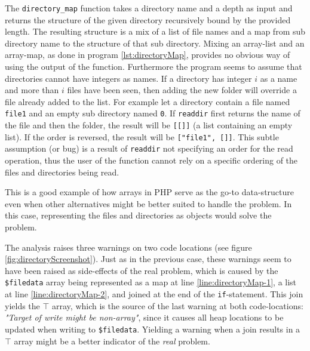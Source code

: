 The \texttt{directory\_map} function takes a directory name and a depth as input and returns the structure of the given directory recursively bound by the provided length. The resulting structure is a mix of a list of file names and a map from sub directory name to the structure of that sub directory. Mixing an array-list and an array-map, as done in program \ref{lst:directoryMap}, provides no obvious way of using the output of the function. Furthermore the program seems to assume that directories cannot have integers as names. If a directory has integer  $i$ as a name and more than $i$ files have been seen, then adding the new folder will override a file already added to the list. For example let a directory contain a file named \texttt{file1} and an empty sub directory named \texttt{0}. If \texttt{readdir} first returns the name of the file and then the folder, the result will be \texttt{[[]]} (a list containing an empty list). If the order is reversed, the result will be \texttt{["file1", []]}. This subtle assumption (or bug) is a result of \texttt{readdir} not specifying an order for the read operation, thus the user of the function cannot rely on a specific ordering of the files and directories being read.

This is a good example of how arrays in PHP serve as the go-to data-structure even when other alternatives might be better suited to handle the problem. In this case, representing the files and directories as objects would solve the problem.


The analysis raises three warnings on two code locations (see figure \ref{fig:directoryScreenshot}). Just as in the previous case, these warnings seem to have been raised as side-effects of the real problem, which is caused by the \texttt{\$filedata} array being represented as a map at line \ref{line:directoryMap-1}, a list at line \ref{line:directoryMap-2}, and joined at the end of the \texttt{if}-statement. This join yields the $\top$ array, which is the source of the last warning at both code-locations: \textit{"Target of write might be non-array"}, since it causes all heap locations to be updated when writing to \texttt{\$filedata}. Yielding a warning when a join results in a $\top$ array might be a better indicator of the \textit{real} problem.

